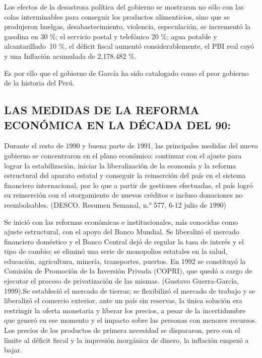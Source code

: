 \documentclass[
  jou,
  floatsintext,
  longtable,
  a4paper,
  nolmodern,
  notxfonts,
  notimes,
  colorlinks=true,linkcolor=blue,citecolor=blue,urlcolor=blue]{apa7}
\begin{document}
Los efectos de la desastrosa política del gobierno se mostraron no sólo
con las colas interminables para conseguir los productos alimenticios,
sino que se produjeron huelgas, desabastecimiento, violencia,
especulación, se incrementó la gasolina en 30 \%; el servicio postal y
telefónico 20 \%; agua potable y alcantarillado~10 \%, el déficit fiscal
aumentó considerablemente, el PBI real cayó y una Inflación acumulada de
2,178.482 \%.

Es por ello que el gobierno de García ha sido catalogado como el peor
gobierno de la historia del Perú.

\subsection{LAS MEDIDAS DE LA REFORMA ECONÓMICA EN LA DÉCADA DEL
90:}\label{las-medidas-de-la-reforma-econuxf3mica-en-la-duxe9cada-del-90}

Durante el resto de 1990 y buena parte de 1991, las principales medidas
del nuevo gobierno se concentraron en el plano económico: continuar con
el ajuste para lograr la estabilización, iniciar la liberalización de la
economía y la reforma estructural del aparato estatal y conseguir la
reinserción del país en el sistema financiero internacional, por lo que
a partir de gestiones efectuadas, el país logró su reinserción con el
otorgamiento de nuevos créditos e incluso donaciones no reembolsables.
(DESCO. Resumen Semanal, n.° 577, 6-12 julio de 1990)

Se inició con las reformas económicas e institucionales, más conocidas
como ajuste estructural, con el apoyo del Banco Mundial. Se liberalizó
el mercado financiero doméstico y el Banco Central dejó de regular la
tasa de interés y el tipo de cambio; se eliminó una serie de monopolios
estatales en la salud, educación, agricultura, minería, transportes,
puertos. En 1992 se constituyó la Comisión de Promoción de la Inversión
Privada (COPRI), que quedó a cargo de ejecutar el proceso de
privatización de las mismas. (Gustavo Guerra-García, 1999).Se estableció
el mercado de tierras; se flexibilizó el mercado de trabajo y se
liberalizó el comercio exterior, ante un país sin reservas, la única
solución era restringir la oferta monetaria y liberar los precios, a
pesar de la incertidumbre que generó en ese momento y el impacto sobre
las personas con menores recursos. Los precios de los productos de
primera necesidad se dispararon, pero con el límite al déficit fiscal y
la impresión inorgánica de dinero, la inflación empezó a bajar.
\end{document}
